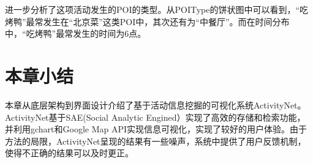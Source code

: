 进一步分析了这项活动发生的POI的类型。从POIType的饼状图中可以看到，``吃烤鸭''最常发生在``北京菜''这类POI中，其次还有为``中餐厅''。而在时间分布中，``吃烤鸭''最常发生的时间为6点。

\section{本章小结}
本章从底层架构到界面设计介绍了基于活动信息挖掘的可视化系统ActivityNet。ActivityNet基于SAE(Social Analytic Engined）实现了高效的存储和检索功能，并利用gchart和Google Map API实现信息可视化，实现了较好的用户体验。由于方法的局限，ActivityNet呈现的结果有一些噪声，系统中提供了用户反馈机制，使得不正确的结果可以及时更正。

